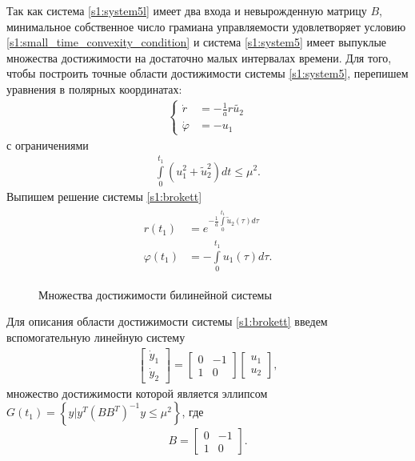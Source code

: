 \documentclass[../main.tex]{subfiles}
\begin{document}
Так как система \eqref{s1:system5l} имеет два входа и невырожденную матрицу $ B $, минимальное собственное число грамиана управляемости удовлетворяет условию \eqref{s1:small_time_convexity_condition} и система \eqref{s1:system5} имеет выпуклые множества достижимости на достаточно малых интервалах времени. 
Для того, чтобы построить точные области достижимости системы \eqref{s1:system5}, перепишем уравнения в полярных координатах:
\begin{gather}\label{s1:brokett}
 \left\{ \begin{aligned}
 \dot{r} &= - \frac{1}{a} r \tilde{u_2}\\
 \dot{\varphi} &= - u_1
 \end{aligned} \right.
\end{gather}
с ограничениями
\begin{gather*}
 \int \limits_0^{t_1} \left( u_1^2 + \tilde{u}_2^2\right) dt \leqslant \mu^2.
\end{gather*}
Выпишем решение системы \eqref{s1:brokett}
\begin{gather*}
\begin{aligned}
 r({t_1}) &= {e^{ - \frac{1}{a}\int\limits_0^{{t_1}} {{{\tilde u}_2}} (\tau )d\tau }}\\
 \varphi ({t_1}) &= - \int\limits_0^{{t_1}} {{u_1}} (\tau )d\tau. 
\end{aligned}
\end{gather*}
\begin{figure}[h]
 \begin{minipage}[h]{0.5\linewidth}
 \end{minipage}
 \hfill
 \begin{minipage}[h]{0.5\linewidth}
 \end{minipage}
 \caption{Множества достижимости билинейной системы}
 \label{s1:fig:fig31}
\end{figure}
 
Для описания области достижимости системы \eqref{s1:brokett} введем вспомогательную линейную систему
\begin{gather}\label{s1:linearized_systembrokett}
 \begin{bmatrix}
 \dot{y}_1\\
 \dot{y}_2
 \end{bmatrix}
 = 
 \begin{bmatrix}
 0& - 1\\
 1&0
 \end{bmatrix} 
 \begin{bmatrix}
 u_1\\
 u_2
 \end{bmatrix},
\end{gather}
множество достижимости которой является эллипсом $ G(t_1) = \left\lbrace y | y^T \left( B B^T\right) ^{-1} y \leqslant \mu^2 \right\rbrace $, где 
\begin{gather*}
 B = \begin{bmatrix}
 0&{ - 1}\\
 1&0
 \end{bmatrix}.
\end{gather*}
 
\end{document}
